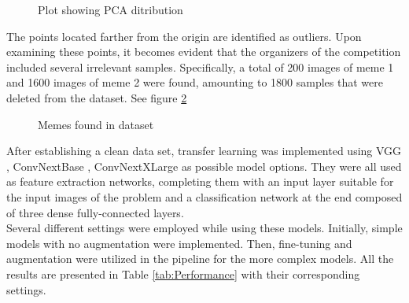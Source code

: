 \documentclass[11pt]{article}
\begin{document}
\begin{multicols}{2}
        \begin{figure}[H]
        \centering
        \caption{Plot showing PCA ditribution}
        \label{fig:fig1}
        \end{figure}

        The points located farther from the origin are identified as outliers. Upon examining these points, it becomes evident that the organizers of the competition included several irrelevant samples. Specifically, a total of 200 images of meme 1 and 1600 images of meme 2 were found, amounting to 1800  samples that were deleted from the dataset. See figure \ref{fig:fig2}

        \begin{figure}[H]
        \centering
        \caption{Memes found in dataset}
        \label{fig:fig2}
        \end{figure}

        After establishing a clean data set, transfer learning was implemented using VGG \cite{simonyan2014very}, ConvNextBase \cite{liu2022convnet}, ConvNextXLarge\cite{liu2022convnet} as possible model options. 
        They were all used as feature extraction networks, completing them with an input layer suitable for the input images of the problem and a classification network at the end composed of three dense fully-connected layers. \\
        Several different settings were employed while using these models. Initially, simple models with no augmentation were implemented. Then, fine-tuning and augmentation were utilized in the pipeline for the more complex models. All the results are presented in Table \ref{tab:Performance} with their corresponding settings. \\
         

\end{multicols}
\end{document}

